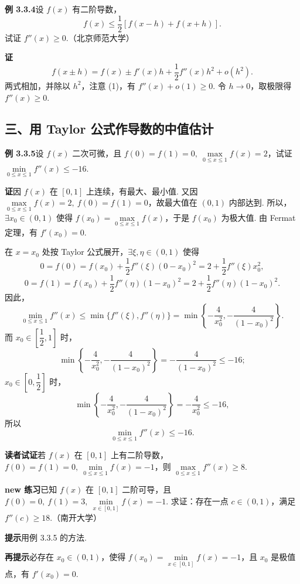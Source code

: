 \documentclass[UTF8, 12pt, fontset=fandol, oneside]{ctexart}
\begin{document}
\noindent\textbf{例 3.3.4}\quad 设 $f(x)$ 有二阶导数，
\begin{equation}
  f(x)\le\frac12[f(x-h)+f(x+h)].
\tag{1}
\end{equation}
试证 $f''(x)\ge0$.（北京师范大学）

\noindent\textbf{证}\quad
\[
  f(x\pm h)=f(x)\pm f'(x)h+\frac12f''(x)h^2+o(h^2).
\]
两式相加，并除以 $h^2$，注意 (1)，有 $f''(x)+o(1)\ge0$. 令 $h\to0$，取极限得 $f''(x)\ge0$.

\subsection*{三、用 Taylor 公式作导数的中值估计}

\noindent\textbf{例 3.3.5}\quad 设 $f(x)$ 二次可微，且 $f(0)=f(1)=0,\ \max\limits_{0\le x\le1}f(x)=2$，试证 $\min\limits_{0\le x\le1}f''(x)\le-16$.

\noindent\textbf{证}\quad 因 $f(x)$ 在 $[0,1]$ 上连续，有最大、最小值. 又因 $\max\limits_{0\le x\le1}f(x)=2,\ f(0)=f(1)=0$，故最大值在 $(0,1)$ 内部达到. 所以，$\exists x_0\in(0,1)$ 使得 $f(x_0)=\max\limits_{0\le x\le1}f(x)$，于是 $f(x_0)$ 为极大值. 由 Fermat 定理，有 $f'(x_0)=0$.

在 $x=x_0$ 处按 Taylor 公式展开，$\exists \xi,\eta\in(0,1)$ 使得
\[
  0=f(0)=f(x_0)+\frac12f''(\xi)(0-x_0)^2=2+\frac12f''(\xi)x_0^2,
\]
\[
  0=f(1)=f(x_0)+\frac12f''(\eta)(1-x_0)^2=2+\frac12f''(\eta)(1-x_0)^2.
\]
因此，
\[
  \min_{0\le x\le1}f''(x)
  \le
  \min\{f''(\xi),f''(\eta)\}
  =
  \min\left\{-\frac4{x_0^2},-\frac4{(1-x_0)^2}\right\}.
\]
而 $x_0\in\left[\dfrac12,1\right]$ 时，
\[
  \min\left\{-\frac4{x_0^2},-\frac4{(1-x_0)^2}\right\}
  =
  -\frac4{(1-x_0)^2}\le-16;
\]
$x_0\in\left[0,\dfrac12\right]$ 时，
\[
  \min\left\{-\frac4{x_0^2},-\frac4{(1-x_0)^2}\right\}
  =
  -\frac4{x_0^2}\le-16,
\]
所以
\[
  \min_{0\le x\le1}f''(x)\le-16.
\]

\noindent\textbf{读者试证}\quad 若 $f(x)$ 在 $[0,1]$ 上有二阶导数，$f(0)=f(1)=0,\ \min\limits_{0\le x\le1}f(x)=-1$，则 $\max\limits_{0\le x\le1}f''(x)\ge8$.

\noindent\textbf{new 练习}\quad 已知 $f(x)$ 在 $[0,1]$ 二阶可导，且 $f(0)=0,\ f(1)=3,\ \min\limits_{x\in[0,1]}f(x)=-1$. 求证：存在一点 $c\in(0,1)$，满足 $f''(c)\ge18$.（南开大学）

\noindent\textbf{提示}\quad 用例 3.3.5 的方法.

\noindent\textbf{再提示}\quad 必存在 $x_0\in(0,1)$，使得 $f(x_0)=\min\limits_{x\in[0,1]}f(x)=-1$，且 $x_0$ 是极值点，有 $f'(x_0)=0$.
\end{document}
